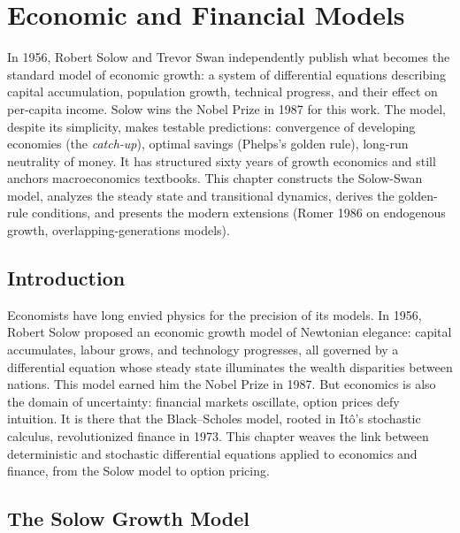 \chapter{Economic and Financial Models}
\label{ch:economic}

In 1956, Robert Solow and Trevor Swan independently publish what becomes the standard model of economic growth: a system of differential equations describing capital accumulation, population growth, technical progress, and their effect on per-capita income. Solow wins the Nobel Prize in 1987 for this work. The model, despite its simplicity, makes testable predictions: convergence of developing economies (the \emph{catch-up}), optimal savings (Phelps's golden rule), long-run neutrality of money. It has structured sixty years of growth economics and still anchors macroeconomics textbooks. This chapter constructs the Solow-Swan model, analyzes the steady state and transitional dynamics, derives the golden-rule conditions, and presents the modern extensions (Romer 1986 on endogenous growth, overlapping-generations models).

\section{Introduction}

Economists have long envied physics for the precision of its models. In 1956, Robert Solow proposed an economic growth model of Newtonian elegance: capital accumulates, labour grows, and technology progresses, all governed by a differential equation whose steady state illuminates the wealth disparities between nations. This model earned him the Nobel Prize in 1987. But economics is also the domain of uncertainty: financial markets oscillate, option prices defy intuition. It is there that the Black--Scholes model, rooted in It\^o's stochastic calculus, revolutionized finance in 1973. This chapter weaves the link between deterministic and stochastic differential equations applied to economics and finance, from the Solow model to option pricing.

\section{The Solow Growth Model}
\label{sec:solow}

